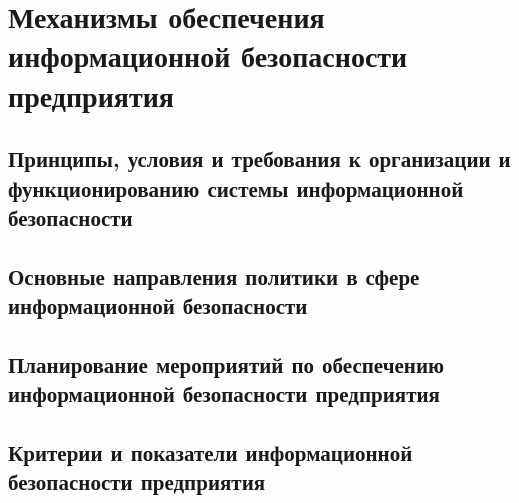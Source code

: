 
\section{Механизмы обеспечения информационной безопасности предприятия}
\label{sec:mechanisms}

\subsection{Принципы, условия и требования к организации и функционированию системы информационной безопасности}
\label{subsec:mechanisms:principles}

\subsection{Основные направления политики в сфере информационной безопасности}
\label{subsec:mechanisms:directions}

\subsection{Планирование мероприятий по обеспечению информационной безопасности предприятия}
\label{subsec:mechanisms:planning}

\subsection{Критерии и показатели информационной безопасности предприятия}
\label{subsec:mechanisms:indicators}

